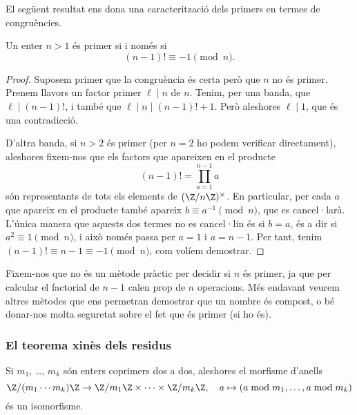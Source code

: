  El següent resultat ens dona una caracterització dels primers en termes de congruències.
\begin{proposition}
 Un enter $n>1$ és primer si i només si
 \[
 (n-1)!\equiv -1\pmod{n}.
 \]
\end{proposition}
\begin{proof}
 Suposem primer que la congruència és certa però que $n$ no és primer. Prenem llavors un factor primer $\ell\mid n$ de $n$. Tenim, per una banda, que $\ell\mid (n-1)!$, i també que $\ell\mid n\mid (n-1)!+1$. Però aleshores $\ell\mid 1$, que és una contradicció.
 
 D'altra banda, si $n>2$ és primer (per $n=2$ ho podem verificar directament), aleshores fixem-nos que els factors que apareixen en el producte
 \[
 (n-1)! = \prod_{a=1}^{n-1} a
 \]
 són representants de tots els elements de $(\Z/n\Z)^\times$. En particular, per cada $a$ que apareix en el producte també apareix $b\equiv a^{-1} \pmod n$, que es cancel·larà. L'única manera que aquests dos termes no es cancel·lin és si $b=a$, és a dir si $a^2\equiv 1\pmod n$, i això només passa per $a=1$ i $a=n-1$. Per tant, tenim $(n-1)!\equiv n-1\equiv -1\pmod n$, com volíem demostrar.
\end{proof}
Fixem-nos que no és un mètode pràctic per decidir si $n$ és primer, ja que per calcular el factorial de $n-1$ calen prop de $n$ operacions. Més endavant veurem altres mètodes que ens permetran demostrar que un nombre és compost, o bé donar-nos molta seguretat sobre el fet que és primer (si ho és).

  \subsubsection{El teorema xinès dels residus}
  
  \begin{theorem}
  \label{thm:crt}
  Si $m_1$, \ldots, $m_k$ són enters coprimers dos a dos, aleshores el morfisme d'anells
  \[
  \Z/(m_1\cdots m_k)\Z\to\Z/m_1\Z \times\cdots\times \Z/m_k\Z,\quad a\mapsto (a\bmod m_1,\ldots, a\bmod m_k)
  \]
  és un isomorfisme.
  \end{theorem}
  
